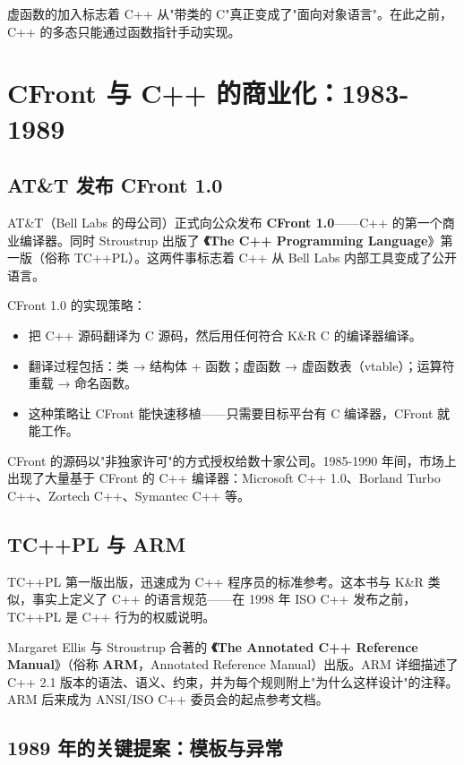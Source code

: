 \documentclass[12pt,a4paper,fontset=fandol]{ctexbook}
\newcommand{\yearlabel}[1]{%
  \tcbox[on line,colback=yearheadbg,colframe=yearheadbg,
    boxrule=0pt,arc=1pt,left=3pt,right=3pt,top=1pt,bottom=1pt,
    colupper=white,fontupper=\scriptsize\bfseries]{#1}}
\newcommand{\yrlbl}[1]{\yearlabel{#1}}
\begin{document}
虚函数的加入标志着 C++ 从"带类的 C"真正变成了"面向对象语言"。在此之前，C++ 的多态只能通过函数指针手动实现。

\chapter{CFront 与 C++ 的商业化：1983-1989}

\section{AT\&T 发布 CFront 1.0}

\yrlbl{1985} AT\&T（Bell Labs 的母公司）正式向公众发布 \textbf{CFront 1.0}——C++ 的第一个商业编译器。同时 Stroustrup 出版了 \textbf{《The C++ Programming Language}》第一版（俗称 TC++PL）。这两件事标志着 C++ 从 Bell Labs 内部工具变成了公开语言。

CFront 1.0 的实现策略：

\begin{itemize}
  \item 把 C++ 源码翻译为 C 源码，然后用任何符合 K\&R C 的编译器编译。
  \item 翻译过程包括：类 → 结构体 + 函数；虚函数 → 虚函数表（vtable）；运算符重载 → 命名函数。
  \item 这种策略让 CFront 能快速移植——只需要目标平台有 C 编译器，CFront 就能工作。
\end{itemize}

CFront 的源码以"非独家许可"的方式授权给数十家公司。1985-1990 年间，市场上出现了大量基于 CFront 的 C++ 编译器：Microsoft C++ 1.0、Borland Turbo C++、Zortech C++、Symantec C++ 等。

\section{TC++PL 与 ARM}

\yrlbl{1985} TC++PL 第一版出版，迅速成为 C++ 程序员的标准参考。这本书与 K\&R 类似，事实上定义了 C++ 的语言规范——在 1998 年 ISO C++ 发布之前，TC++PL 是 C++ 行为的权威说明。

\yrlbl{1990} Margaret Ellis 与 Stroustrup 合著的 \textbf{《The Annotated C++ Reference Manual}》（俗称 \textbf{ARM}，Annotated Reference Manual）出版。ARM 详细描述了 C++ 2.1 版本的语法、语义、约束，并为每个规则附上"为什么这样设计"的注释。ARM 后来成为 ANSI/ISO C++ 委员会的起点参考文档。

\section{1989 年的关键提案：模板与异常}
\end{document}
